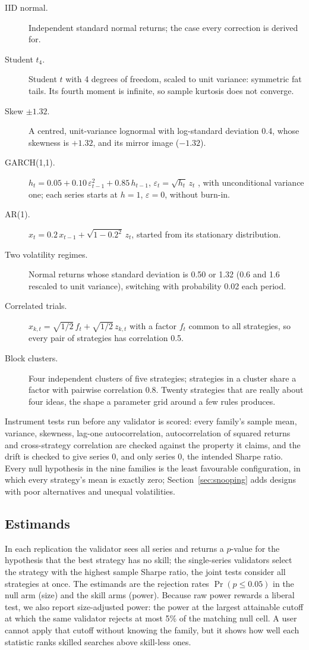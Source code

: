 \begin{description}
  \item[IID normal.] Independent standard normal returns; the case every correction is derived for.
  \item[Student $t_4$.] Student $t$ with 4 degrees of freedom, scaled to unit variance: symmetric fat tails. Its fourth moment is infinite, so sample kurtosis does not converge.
  \item[Skew $\pm1.32$.] A centred, unit-variance lognormal with log-standard deviation 0.4, whose skewness is $+1.32$, and its mirror image ($-1.32$).
  \item[GARCH(1,1).] $h_t = 0.05 + 0.10\,\varepsilon_{t-1}^2 + 0.85\,h_{t-1}$, $\varepsilon_t=\sqrt{h_t}\,z_t$ \citep{bollerslev1986garch}, with unconditional variance one; each series starts at $h=1$, $\varepsilon=0$, without burn-in.
  \item[AR(1).] $x_t = 0.2\,x_{t-1} + \sqrt{1-0.2^2}\,z_t$, started from its stationary distribution.
  \item[Two volatility regimes.] Normal returns whose standard deviation is 0.50 or 1.32 (0.6 and 1.6 rescaled to unit variance), switching with probability 0.02 each period.
  \item[Correlated trials.] $x_{k,t} = \sqrt{1/2}\,f_t + \sqrt{1/2}\,z_{k,t}$ with a factor $f_t$ common to all strategies, so every pair of strategies has correlation 0.5.
  \item[Block clusters.] Four independent clusters of five strategies; strategies in a cluster share a factor with pairwise correlation 0.8. Twenty strategies that are really about four ideas, the shape a parameter grid around a few rules produces.
\end{description}

Instrument tests run before any validator is scored: every family's sample mean, variance, skewness, lag-one autocorrelation, autocorrelation of squared returns and cross-strategy correlation are checked against the property it claims, and the drift is checked to give series 0, and only series 0, the intended Sharpe ratio. Every null hypothesis in the nine families is the least favourable configuration, in which every strategy's mean is exactly zero; Section~\ref{sec:snooping} adds designs with poor alternatives and unequal volatilities.

\subsection{Estimands}
In each replication the validator sees all  series and returns a $p$-value for the hypothesis that the best strategy has no skill; the single-series validators select the strategy with the highest sample Sharpe ratio, the joint tests consider all strategies at once. The estimands are the rejection rates $\Pr(p \le 0.05)$ in the null arm (size) and the skill arms (power). Because raw power rewards a liberal test, we also report size-adjusted power: the power at the largest attainable cutoff at which the same validator rejects at most 5\% of the matching null cell. A user cannot apply that cutoff without knowing the family, but it shows how well each statistic ranks skilled searches above skill-less ones.

